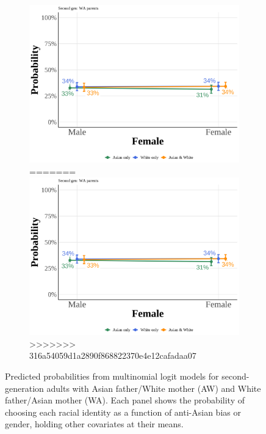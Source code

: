 \begin{center}
\begin{figure}[!htb]
\begin{subfigure}{.48\textwidth}
\includegraphics[width=1\linewidth]{pp_second_wa_Female_simple.png}\label{subfig:pp-secgen-wa-female}
=======
\includegraphics[width=1\linewidth]{pp_second_wa_Female_simple.png}
>>>>>>> 316a54059d1a2890f868822370e4e12cafadaa07
\end{subfigure}

\caption*{\footnotesize{Predicted probabilities from multinomial logit models for second-generation adults with Asian father/White mother (AW) and White father/Asian mother (WA). Each panel shows the probability of choosing each racial identity as a function of anti-Asian bias or gender, holding other covariates at their means.}}
\end{figure}
\end{center}

